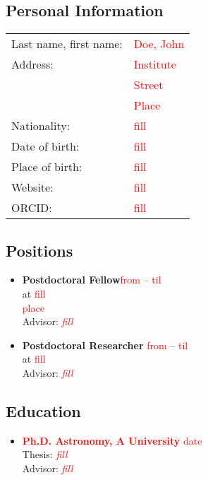 \subsection*{Personal Information}
\begin{tabular}{p{5cm}l}
Last name, first name:		& \textcolor{red}{Doe, John}\\[0.1cm]
Address:					& \textcolor{red}{Institute}\\
							& \textcolor{red}{Street}\\
							& \textcolor{red}{Place}\\[0.1cm]
Nationality:				& \textcolor{red}{fill}\\[0.1cm]
Date of birth:				& \textcolor{red}{fill}\\[0.1cm]
Place of birth:				& \textcolor{red}{fill}\\[0.1cm]
Website:					& \textcolor{red}{fill}\\[0.1cm]
ORCID:						& \textcolor{red}{fill}
\end{tabular}

\subsection*{Positions}
\begin{itemize}
\item \textbf{Postdoctoral Fellow}\hfill \textcolor{red}{from} -- \textcolor{red}{til}\\
					at \textcolor{red}{fill}\\
					\textcolor{red}{place}\\
					Advisor: \textit{\textcolor{red}{fill}}\\[-0.75em]
\item \textbf{Postdoctoral Researcher} \hfill \textcolor{red}{from} -- \textcolor{red}{til}	\\
					at \textcolor{red}{fill}\\
					Advisor: \textit{\textcolor{red}{fill}}
\end{itemize}

\subsection*{Education}
\begin{itemize}
\item \textbf{\textcolor{red}{Ph.D. Astronomy, A University}}		 \hfill \textcolor{red}{date}\\
	Thesis: \textit{\textcolor{red}{fill}}\\
	Advisor: \textit{\textcolor{red}{fill}}\\[-0.75em]
\end{itemize}
	
